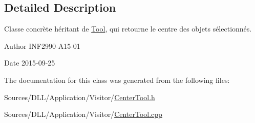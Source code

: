 \subsection{Detailed Description}
Classe concrète héritant de \hyperlink{class_tool}{Tool}, qui retourne le centre des objets sélectionnés. 

\begin{DoxyAuthor}{Author}
I\+N\+F2990-\/\+A15-\/01 
\end{DoxyAuthor}
\begin{DoxyDate}{Date}
2015-\/09-\/25 
\end{DoxyDate}


The documentation for this class was generated from the following files\+:\begin{DoxyCompactItemize}
\item 
Sources/\+D\+L\+L/\+Application/\+Visitor/\hyperlink{_center_tool_8h}{Center\+Tool.\+h}\item 
Sources/\+D\+L\+L/\+Application/\+Visitor/\hyperlink{_center_tool_8cpp}{Center\+Tool.\+cpp}\end{DoxyCompactItemize}
